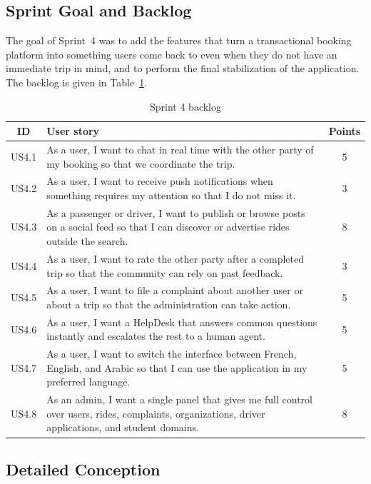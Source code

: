 \subsection{Sprint Goal and Backlog}

The goal of Sprint~4 was to add the features that turn a transactional booking platform into something users come back to even when they do not have an immediate trip in mind, and to perform the final stabilization of the application. The backlog is given in Table~\ref{tab:sprint4_backlog}.

\begin{table}[H]
\centering
\caption{Sprint 4 backlog}
\label{tab:sprint4_backlog}
\begin{tabular}{|c|p{8.5cm}|c|}
\hline
\textbf{ID} & \textbf{User story} & \textbf{Points} \\
\hline
US4.1 & As a user, I want to chat in real time with the other party of my booking so that we coordinate the trip. & 5 \\
\hline
US4.2 & As a user, I want to receive push notifications when something requires my attention so that I do not miss it. & 3 \\
\hline
US4.3 & As a passenger or driver, I want to publish or browse posts on a social feed so that I can discover or advertise rides outside the search. & 8 \\
\hline
US4.4 & As a user, I want to rate the other party after a completed trip so that the community can rely on past feedback. & 3 \\
\hline
US4.5 & As a user, I want to file a complaint about another user or about a trip so that the administration can take action. & 5 \\
\hline
US4.6 & As a user, I want a HelpDesk that answers common questions instantly and escalates the rest to a human agent. & 5 \\
\hline
US4.7 & As a user, I want to switch the interface between French, English, and Arabic so that I can use the application in my preferred language. & 5 \\
\hline
US4.8 & As an admin, I want a single panel that gives me full control over users, rides, complaints, organizations, driver applications, and student domains. & 8 \\
\hline
\end{tabular}
\end{table}

\subsection{Detailed Conception}


